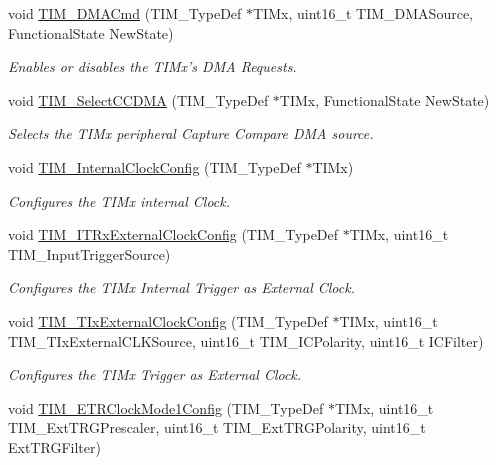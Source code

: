 \begin{DoxyCompactItemize}
void \hyperlink{group___t_i_m_ga24700389cfa3ea9b42234933b23f1399}{T\-I\-M\-\_\-\-D\-M\-A\-Cmd} (T\-I\-M\-\_\-\-Type\-Def $\ast$T\-I\-Mx, uint16\-\_\-t T\-I\-M\-\_\-\-D\-M\-A\-Source, Functional\-State New\-State)
\begin{DoxyCompactList}\small\item\em Enables or disables the T\-I\-Mx's D\-M\-A Requests. \end{DoxyCompactList}\item 
void \hyperlink{group___t_i_m_ga5273cb65acb885fe7982827b1c6b7d75}{T\-I\-M\-\_\-\-Select\-C\-C\-D\-M\-A} (T\-I\-M\-\_\-\-Type\-Def $\ast$T\-I\-Mx, Functional\-State New\-State)
\begin{DoxyCompactList}\small\item\em Selects the T\-I\-Mx peripheral Capture Compare D\-M\-A source. \end{DoxyCompactList}\item 
void \hyperlink{group___t_i_m_ga2394f0221709c0659874f9a4184cf86e}{T\-I\-M\-\_\-\-Internal\-Clock\-Config} (T\-I\-M\-\_\-\-Type\-Def $\ast$T\-I\-Mx)
\begin{DoxyCompactList}\small\item\em Configures the T\-I\-Mx internal Clock. \end{DoxyCompactList}\item 
void \hyperlink{group___t_i_m_gabef227d21d9e121e6a4ec5ab6223f5a9}{T\-I\-M\-\_\-\-I\-T\-Rx\-External\-Clock\-Config} (T\-I\-M\-\_\-\-Type\-Def $\ast$T\-I\-Mx, uint16\-\_\-t T\-I\-M\-\_\-\-Input\-Trigger\-Source)
\begin{DoxyCompactList}\small\item\em Configures the T\-I\-Mx Internal Trigger as External Clock. \end{DoxyCompactList}\item 
void \hyperlink{group___t_i_m_gaf460e7d9c9969044e364130e209937fc}{T\-I\-M\-\_\-\-T\-Ix\-External\-Clock\-Config} (T\-I\-M\-\_\-\-Type\-Def $\ast$T\-I\-Mx, uint16\-\_\-t T\-I\-M\-\_\-\-T\-Ix\-External\-C\-L\-K\-Source, uint16\-\_\-t T\-I\-M\-\_\-\-I\-C\-Polarity, uint16\-\_\-t I\-C\-Filter)
\begin{DoxyCompactList}\small\item\em Configures the T\-I\-Mx Trigger as External Clock. \end{DoxyCompactList}\item 
void \hyperlink{group___t_i_m_ga47c05638b93aabcd641dbc8859e1b2df}{T\-I\-M\-\_\-\-E\-T\-R\-Clock\-Mode1\-Config} (T\-I\-M\-\_\-\-Type\-Def $\ast$T\-I\-Mx, uint16\-\_\-t T\-I\-M\-\_\-\-Ext\-T\-R\-G\-Prescaler, uint16\-\_\-t T\-I\-M\-\_\-\-Ext\-T\-R\-G\-Polarity, uint16\-\_\-t Ext\-T\-R\-G\-Filter)

\end{DoxyCompactItemize}

